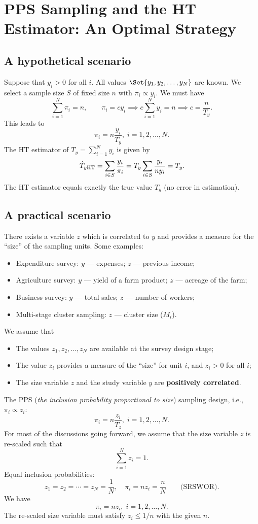 \section{PPS Sampling and the HT Estimator: An Optimal Strategy}
\subsection{A hypothetical scenario}
Suppose that $ y_i>0 $ for all $ i $. All values $ \Set{y_1,y_2,\ldots,y_N} $
are known. We select a sample size $ S $ of fixed size $ n $ with $ \pi_i\propto y_i $.
We must have
\[ \sum_{i=1}^{N}\pi_i=n,\qquad \pi_i=cy_i\implies c \sum_{i=1}^{N}y_i=n\implies c=\frac{n}{T_y}.  \]
This leads to
\[ \pi_i=n \frac{y_i}{T_y},\; i=1,2,\ldots,N. \]
The HT estimator of $ T_y=\sum_{i=1}^{N}y_i $ is given by
\[ \hat{T}_{y\text{HT}}=\sum_{i\in S}\frac{y_i}{\pi_i}=T_y \sum_{i\in S}\frac{y_i}{n y_i}=T_y. \]
The HT estimator equals exactly the true value $ T_y $ (no error in
estimation).

\subsection{A practical scenario}
There exists a variable $z$ which is correlated to $y$ and provides a
measure for the ``size'' of the sampling units. Some examples:
\begin{itemize}
      \item Expenditure survey: $y$ --- expenses; $z$ --- previous income;
      \item Agriculture survey: $y$ --- yield of a farm product; $z$ --- acreage of the
            farm;
      \item Business survey: $y$ --- total sales; $z$ --- number of workers;
      \item Multi-stage cluster sampling: $z$ --- cluster size ($ M_i $).
\end{itemize}
We assume that
\begin{itemize}
      \item The values $ z_1,z_2,\ldots,z_N $ are available at the survey design stage;
      \item The value $ z_i $ provides a measure of the ``size'' for unit $ i $, and $ z_i>0 $ for all $ i $;
      \item The size variable $ z $ and the study variable $ y $ are \textbf{positively correlated}.
\end{itemize}

The PPS (\emph{the inclusion probability proportional to size}) sampling
design, i.e., $ \pi_i\propto z_i $:
\[ \pi_i=n \frac{z_i}{T_z},\; i=1,2,\ldots,N. \]
For most of the discussions going forward, we assume that the size variable $ z $ is re-scaled such that
\[ \sum_{i=1}^{N}z_i=1. \]
Equal inclusion probabilities:
\[ z_1=z_2=\cdots=z_N=\frac{1}{N},\quad \pi_i=n z_i=\frac{n}{N}\qquad \text{(SRSWOR)}. \]
We have
\[ \pi_i=n z_i,\; i=1,2,\ldots,N. \]
The re-scaled size variable must satisfy $ z_i\le 1/n $ with the given $ n $.

